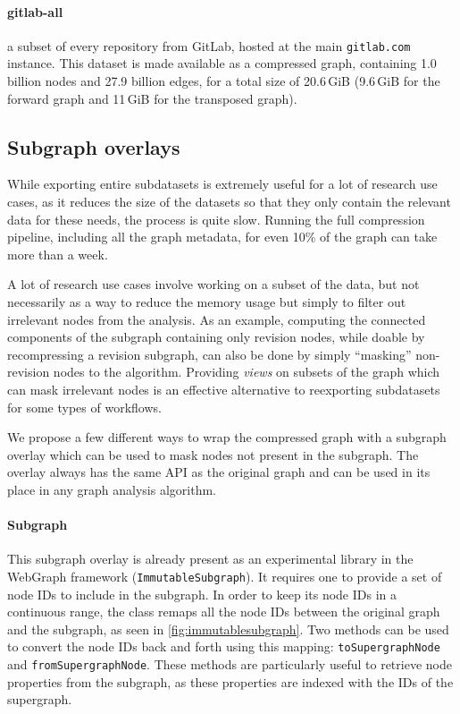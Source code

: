\paragraph{gitlab-all} a subset of every repository from GitLab, hosted at the
main \texttt{gitlab.com} instance. This dataset is made available as a
compressed graph, containing 1.0 billion nodes and 27.9 billion edges, for a
total size of 20.6\,GiB (9.6\,GiB for the forward graph and 11\,GiB for the
transposed graph).

\subsection{Subgraph overlays}

While exporting entire subdatasets is extremely useful for a lot of research
use cases, as it reduces the size of the datasets so that they only contain the
relevant data for these needs, the process is quite slow. Running the full
compression pipeline, including all the graph metadata, for even 10\% of the
graph can take more than a week.

A lot of research use cases involve working on a subset of the data, but not
necessarily as a way to reduce the memory usage but simply to filter out
irrelevant nodes from the analysis. As an example, computing the connected
components of the subgraph containing only revision nodes, while doable by
recompressing a revision subgraph, can also be done by simply ``masking''
non-revision nodes to the algorithm. Providing \emph{views} on subsets of the
graph which can mask irrelevant nodes is an effective alternative to
reexporting subdatasets for some types of workflows.

We propose a few different ways to wrap the compressed graph with a subgraph
overlay which can be used to mask nodes not present in the subgraph. The
overlay always has the same API as the original graph and can be used in its
place in any graph analysis algorithm.

\paragraph{Subgraph}
This subgraph overlay is already present as an experimental library in the
WebGraph framework (\texttt{ImmutableSubgraph}). It requires one to provide a
set of node IDs to include in the subgraph. In order to keep its node IDs in a
continuous range, the class remaps all the node IDs between the original graph
and the subgraph, as seen in \cref{fig:immutablesubgraph}. Two methods can be
used to convert the node IDs back and forth using this mapping:
\texttt{toSupergraph\allowbreak{}Node} and \texttt{fromSupergraphNode}. These
methods are particularly useful to retrieve node properties from the subgraph,
as these properties are indexed with the IDs of the supergraph.


